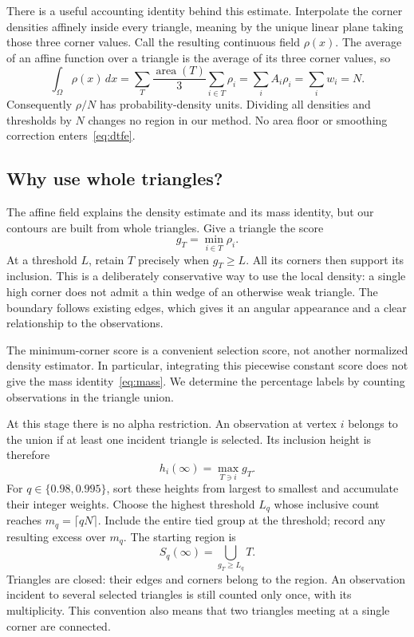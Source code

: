 \documentclass[11pt]{article}
\newcommand{\area}{\operatorname{area}}
\begin{document}
There is a useful accounting identity behind this estimate. Interpolate
the corner densities affinely inside every triangle, meaning by the unique
linear plane taking those three corner values. Call the resulting continuous
field $\rho(x)$. The average of an affine function over a triangle is the
average of its three corner values, so
\begin{equation}
 \int_\Omega\rho(x)\,dx
 =\sum_T\frac{\area(T)}3\sum_{i\in T}\rho_i
 =\sum_i A_i\rho_i=\sum_i w_i=N.
 \label{eq:mass}
\end{equation}
Consequently $\rho/N$ has probability-density units. Dividing all densities
and thresholds by $N$ changes no region in our method. No area floor or
smoothing correction enters~\eqref{eq:dtfe}.

\subsection{Why use whole triangles?}

The affine field explains the density estimate and its mass identity, but
our contours are built from whole triangles. Give a triangle the score
\begin{equation}
 g_T=\min_{i\in T}\rho_i.
 \label{eq:gate}
\end{equation}
At a threshold $L$, retain $T$ precisely when $g_T\geq L$. All its corners
then support its inclusion. This is a deliberately conservative way to use
the local density: a single high corner does not admit a thin wedge of an
otherwise weak triangle. The boundary follows existing edges, which gives
it an angular appearance and a clear relationship to the observations.

The minimum-corner score is a convenient selection score, not another
normalized density estimator. In particular, integrating this piecewise
constant score does not give the mass identity~\eqref{eq:mass}. We determine
the percentage labels by counting observations in the triangle union.

At this stage there is no alpha restriction. An observation at vertex $i$
belongs to the union if at least one incident triangle is selected. Its
inclusion height is therefore
\begin{equation}
 h_i(\infty)=\max_{T\ni i}g_T.
\end{equation}
For $q\in\{0.98,0.995\}$, sort these heights from largest to smallest and
accumulate their integer weights. Choose the highest threshold $L_q$ whose
inclusive count reaches $m_q=\lceil qN\rceil$. Include the entire tied group
at the threshold; record any resulting excess over $m_q$. The starting
region is
\begin{equation}
 S_q(\infty)=\bigcup_{g_T\geq L_q}T.
 \label{eq:baseline}
\end{equation}
Triangles are closed: their edges and corners belong to the region.
An observation incident to several selected triangles is still counted only
once, with its multiplicity. This convention also means that two triangles
meeting at a single corner are connected.
\end{document}

